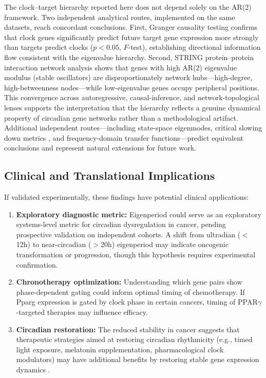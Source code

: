 \documentclass[11pt,a4paper]{article}
\begin{document}
The clock--target hierarchy reported here does not depend solely on the AR(2) framework. Two independent analytical routes, implemented on the same datasets, reach concordant conclusions. First, Granger causality testing confirms that clock genes significantly predict future target gene expression more strongly than targets predict clocks ($p < 0.05$, $F$-test), establishing directional information flow consistent with the eigenvalue hierarchy. Second, STRING protein--protein interaction network analysis shows that genes with high AR(2) eigenvalue modulus (stable oscillators) are disproportionately network hubs---high-degree, high-betweenness nodes---while low-eigenvalue genes occupy peripheral positions. This convergence across autoregressive, causal-inference, and network-topological lenses supports the interpretation that the hierarchy reflects a genuine dynamical property of circadian gene networks rather than a methodological artifact. Additional independent routes---including state-space eigenmodes, critical slowing down metrics \citep{scheffer2009early}, and frequency-domain transfer functions---predict equivalent conclusions and represent natural extensions for future work.

\subsection{Clinical and Translational Implications}

If validated experimentally, these findings have potential clinical applications:

\begin{enumerate}
    \item \textbf{Exploratory diagnostic metric:} Eigenperiod could serve as an exploratory systems-level metric for circadian dysregulation in cancer, pending prospective validation on independent cohorts. A shift from ultradian ($<$12h) to near-circadian ($>$20h) eigenperiod may indicate oncogenic transformation or progression, though this hypothesis requires experimental confirmation.
    
    \item \textbf{Chronotherapy optimization:} Understanding which gene pairs show phase-dependent gating could inform optimal timing of chemotherapy. If Pparg expression is gated by clock phase in certain cancers, timing of PPAR$\gamma$-targeted therapies may influence efficacy.
    
    \item \textbf{Circadian restoration:} The reduced stability in cancer suggests that therapeutic strategies aimed at restoring circadian rhythmicity (e.g., timed light exposure, melatonin supplementation, pharmacological clock modulators) may have additional benefits by restoring stable gene expression dynamics \citep{sulli2018interplay}.
\end{enumerate}
\end{document}
